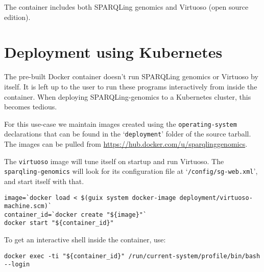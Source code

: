   The container includes both SPARQLing genomics and Virtuoso (open source
  edition).

\section{Deployment using Kubernetes}

  The pre-built Docker container doesn't run SPARQLing genomics or Virtuoso
  by itself.  It is left up to the user to run these programs interactively
  from inside the container.  When deploying SPARQLing-genomics to a Kubernetes
  cluster, this becomes tedious.

  \begin{sloppypar}
  For this use-case we maintain images created using the \texttt{operating-system}
  declarations that can be found in the `\texttt{deployment}' folder of the
  source tarball.  The images can be pulled from
  \href{https://hub.docker.com/u/sparqlinggenomics}
       {https://hub.docker.com/u/sparqlinggenomics}.
  \end{sloppypar}

  The \texttt{virtuoso} image will tune itself on startup and
  run Virtuoso.  The \texttt{sparqling-genomics} will look for its
  configuration file at `\texttt{/config/sg-web.xml}', and start itself with
  that.

\begin{siderules}
\begin{verbatim}
image=`docker load < $(guix system docker-image deployment/virtuoso-machine.scm)`
container_id=`docker create "${image}"`
docker start "${container_id}"
\end{verbatim}
\end{siderules}

To get an interactive shell inside the container, use:
\begin{siderules}
\begin{verbatim}
docker exec -ti "${container_id}" /run/current-system/profile/bin/bash --login
\end{verbatim}
\end{siderules}
